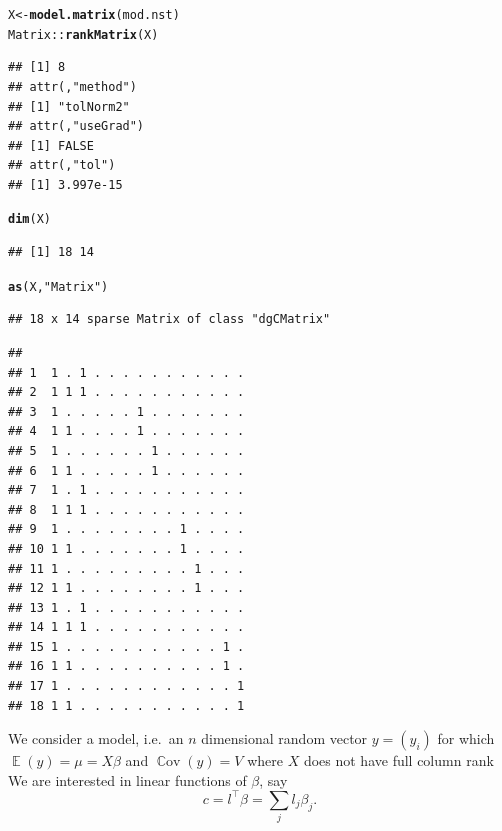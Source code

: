 \documentclass[10pt]{article}\usepackage[]{graphicx}\usepackage[]{color}
\makeatletter
\newcommand{\hlstr}[1]{\textcolor[rgb]{0.192,0.494,0.8}{#1}}%
\newcommand{\hlopt}[1]{\textcolor[rgb]{0,0,0}{#1}}%
\newcommand{\hlstd}[1]{\textcolor[rgb]{0.345,0.345,0.345}{#1}}%
\newcommand{\hlkwb}[1]{\textcolor[rgb]{0.69,0.353,0.396}{#1}}%
\newcommand{\hlkwd}[1]{\textcolor[rgb]{0.737,0.353,0.396}{\textbf{#1}}}%
\newenvironment{kframe}{%
 \def\at@end@of@kframe{}%
 \ifinner\ifhmode%
  \def\at@end@of@kframe{\end{minipage}}%
  \begin{minipage}{\columnwidth}%
 \fi\fi%
 \def\FrameCommand##1{\hskip\@totalleftmargin \hskip-\fboxsep
 \colorbox{shadecolor}{##1}\hskip-\fboxsep
     \hskip-\linewidth \hskip-\@totalleftmargin \hskip\columnwidth}%
 \MakeFramed {\advance\hsize-\width
   \@totalleftmargin\z@ \linewidth\hsize
   \@setminipage}}%
 {\par\unskip\endMakeFramed%
 \at@end@of@kframe}
\newenvironment{knitrout}{}{} %
\DeclareMathOperator{\EE}{\mathbb{E}}
\DeclareMathOperator{\cov}{\mathbb{C}ov}
\newcommand{\transp}{^{\top}}
\makeatother
\begin{document}
\begin{knitrout}
\color{fgcolor}\begin{kframe}
\begin{alltt}
\hlstd{X} \hlkwb{<-} \hlkwd{model.matrix}\hlstd{( mod.nst )}
\hlstd{Matrix}\hlopt{::}\hlkwd{rankMatrix}\hlstd{(X)}
\end{alltt}
\begin{verbatim}
## [1] 8
## attr(,"method")
## [1] "tolNorm2"
## attr(,"useGrad")
## [1] FALSE
## attr(,"tol")
## [1] 3.997e-15
\end{verbatim}
\begin{alltt}
\hlkwd{dim}\hlstd{(X)}
\end{alltt}
\begin{verbatim}
## [1] 18 14
\end{verbatim}
\begin{alltt}
\hlkwd{as}\hlstd{(X,} \hlstr{"Matrix"}\hlstd{)}
\end{alltt}
\begin{verbatim}
## 18 x 14 sparse Matrix of class "dgCMatrix"
\end{verbatim}


{\ttfamily\noindent\itshape\color{messagecolor}{\#\#\ \ \ \ [[ suppressing 14 column names '(Intercept)', 'AA2', 'BB1:CC1' ... ]]}}\begin{verbatim}
##                               
## 1  1 . 1 . . . . . . . . . . .
## 2  1 1 1 . . . . . . . . . . .
## 3  1 . . . . . 1 . . . . . . .
## 4  1 1 . . . . 1 . . . . . . .
## 5  1 . . . . . . 1 . . . . . .
## 6  1 1 . . . . . 1 . . . . . .
## 7  1 . 1 . . . . . . . . . . .
## 8  1 1 1 . . . . . . . . . . .
## 9  1 . . . . . . . . 1 . . . .
## 10 1 1 . . . . . . . 1 . . . .
## 11 1 . . . . . . . . . 1 . . .
## 12 1 1 . . . . . . . . 1 . . .
## 13 1 . 1 . . . . . . . . . . .
## 14 1 1 1 . . . . . . . . . . .
## 15 1 . . . . . . . . . . . 1 .
## 16 1 1 . . . . . . . . . . 1 .
## 17 1 . . . . . . . . . . . . 1
## 18 1 1 . . . . . . . . . . . 1
\end{verbatim}
\end{kframe}
\end{knitrout}

We consider a  model, i.e.\
an $n$ dimensional random vector $y=(y_i)$ for which
$\EE(y)=\mu=X\beta$ and $\cov(y)=V$ where $X$ does not have
full column rank
We are
interested in linear functions of $\beta$, say
\begin{displaymath}
  c=l\transp\beta= \sum_j l_j \beta_j .
\end{displaymath}
\end{document}
